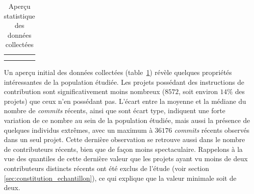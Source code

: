 \documentclass[dvipsnames,runningheads]{llncs}
\newcommand{\en}[1]{\foreignlanguage{english}{\emph{#1}}}
\begin{document}
    \begin{table}[ht]
        \centering
        \caption{Aperçu statistique des données collectées}
        \begin{tabular}{c|c}
             &
            \\
            \hline
            \\
             &
            
        \end{tabular}
        \label{tab:data_description}
    \end{table}

    Un aperçu initial des données collectées (table~\ref{tab:data_description}) révèle quelques propriétés
    intéressantes de la population étudiée. Les projets possédant des instructions de contribution sont
    significativement moins nombreux ($8 572$, soit environ $14\%$ des projets) que ceux n'en possédant pas.
    L'écart entre la moyenne et la médiane du nombre de \en{commits} récents, ainsi que sont écart type,
    indiquent une forte variation de ce nombre au sein de la population étudiée, mais aussi la présence de
    quelques individus extrêmes, avec un maximum à $36 176$ \en{commits} récents observés dans un seul projet.
    Cette dernière observation se retrouve aussi dans le nombre de contributeurs récents, bien que de façon
    moins spectaculaire. Rappelons à la vue des quantiles de cette dernière valeur que les projets ayant vu
    moins de deux contributeurs distincts récents ont été exclus de l'étude (voir section
    \ref{sec:constitution_echantillon}), ce qui explique que la valeur minimale soit de deux.
\end{document}
